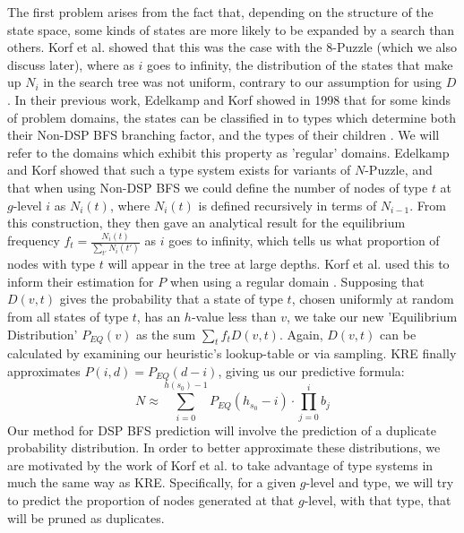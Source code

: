 \documentclass{article}
\begin{document}
The first problem arises from the fact that, depending on the structure of the state space,
some kinds of states are more likely to be expanded by a search than others.
Korf et al. showed that this was the case with the \(8\)-Puzzle (which we also discuss later),
where as \(i\) goes to infinity, the distribution of the states
that make up \(N_i\) in the search tree was not uniform, contrary to our assumption for using \(D\).
In their previous work, Edelkamp and Korf showed in 1998 that for some kinds of problem domains,
the states can be classified in to types which determine both
their Non-DSP BFS branching factor, and the types of their children \cite{edelkamp1998branching}.
We will refer to the domains which exhibit this property as 'regular' domains.
Edelkamp and Korf showed that such a type system exists for variants of \(N\)-Puzzle,
and that when using Non-DSP BFS we could define the number of nodes of type \(t\) at \(g\)-level \(i\)
as \(N_i(t)\), where \(N_i(t)\) is defined recursively in terms of \(N_{i-1}\).
From this construction, they then gave an analytical result for the equilibrium frequency \(f_t = \frac{N_i(t)}{\sum_{t'}N_i(t')}\) as \(i\) goes to infinity, which tells us what proportion of nodes with type \(t\) will appear in the tree at large depths.
Korf et al. used this to inform their estimation for \(P\) when using a regular domain \cite{korf2001time}.
Supposing that \(D(v,t)\) gives the probability that a state of type \(t\),
chosen uniformly at random from all states of type \(t\), has an \(h\)-value less than \(v\),
we take our new 'Equilibrium Distribution' \(P_{EQ}(v)\) as the sum \(\sum_{t} f_t D(v, t) \).
Again, \(D(v,t)\) can be calculated by examining our heuristic's lookup-table or via sampling.
KRE finally approximates \(P(i,d) = P_{EQ}(d - i)\), giving us our predictive formula:
\[N \approx \sum^{h(s_0) - 1}_{i = 0} P_{EQ}(h_{s_0} - i) \cdot \prod^{i}_{j = 0} b_j  \]
Our method for DSP BFS prediction will involve the prediction of a duplicate probability distribution.
In order to better approximate these distributions,
we are motivated by the work of Korf et al. to take advantage of type systems in much the same way as KRE.
Specifically, for a given \(g\)-level and type, we will try to predict the proportion of nodes generated at that \(g\)-level, with that type,
that will be pruned as duplicates. \\
\end{document}
